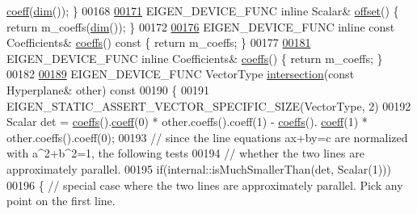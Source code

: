 \begin{DoxyCode}
      \hyperlink{class_eigen_1_1_plain_object_base_afbfc12954f16d21aedb7bd839f64a278}{coeff}(\hyperlink{group___geometry___module_a44f0dab75a838cdadf1df9150648b8ed}{dim}()); \}
00168 
\hyperlink{group___geometry___module_afd7e3b9a09ba528523ddc4bac7555dbd}{00171}   EIGEN\_DEVICE\_FUNC \textcolor{keyword}{inline} Scalar& \hyperlink{group___geometry___module_afd7e3b9a09ba528523ddc4bac7555dbd}{offset}() \{ \textcolor{keywordflow}{return} m\_coeffs(\hyperlink{group___geometry___module_a44f0dab75a838cdadf1df9150648b8ed}{dim}()); \}
00172 
\hyperlink{group___geometry___module_ae9e0a6a6a2c1643a788770dd08e89b3f}{00176}   EIGEN\_DEVICE\_FUNC \textcolor{keyword}{inline} \textcolor{keyword}{const} Coefficients& \hyperlink{group___geometry___module_ae9e0a6a6a2c1643a788770dd08e89b3f}{coeffs}()\textcolor{keyword}{ const }\{ \textcolor{keywordflow}{return} m\_coeffs; \}
00177 
\hyperlink{group___geometry___module_a78975a8404b60f9eb032a80c6827338a}{00181}   EIGEN\_DEVICE\_FUNC \textcolor{keyword}{inline} Coefficients& \hyperlink{group___geometry___module_a78975a8404b60f9eb032a80c6827338a}{coeffs}() \{ \textcolor{keywordflow}{return} m\_coeffs; \}
00182 
\hyperlink{group___geometry___module_a9cb359548dd43991c372935f6bc3df61}{00189}   EIGEN\_DEVICE\_FUNC VectorType \hyperlink{group___geometry___module_a9cb359548dd43991c372935f6bc3df61}{intersection}(\textcolor{keyword}{const} Hyperplane& other)\textcolor{keyword}{ const}
00190 \textcolor{keyword}{  }\{
00191     EIGEN\_STATIC\_ASSERT\_VECTOR\_SPECIFIC\_SIZE(VectorType, 2)
00192     Scalar det = \hyperlink{group___geometry___module_ae9e0a6a6a2c1643a788770dd08e89b3f}{coeffs}().\hyperlink{class_eigen_1_1_plain_object_base_afbfc12954f16d21aedb7bd839f64a278}{coeff}(0) * other.coeffs().coeff(1) - \hyperlink{group___geometry___module_ae9e0a6a6a2c1643a788770dd08e89b3f}{coeffs}().
      \hyperlink{class_eigen_1_1_plain_object_base_afbfc12954f16d21aedb7bd839f64a278}{coeff}(1) * other.coeffs().coeff(0);
00193     \textcolor{comment}{// since the line equations ax+by=c are normalized with a^2+b^2=1, the following tests}
00194     \textcolor{comment}{// whether the two lines are approximately parallel.}
00195     \textcolor{keywordflow}{if}(internal::isMuchSmallerThan(det, Scalar(1)))
00196     \{   \textcolor{comment}{// special case where the two lines are approximately parallel. Pick any point on the first line.}

\end{DoxyCode}
